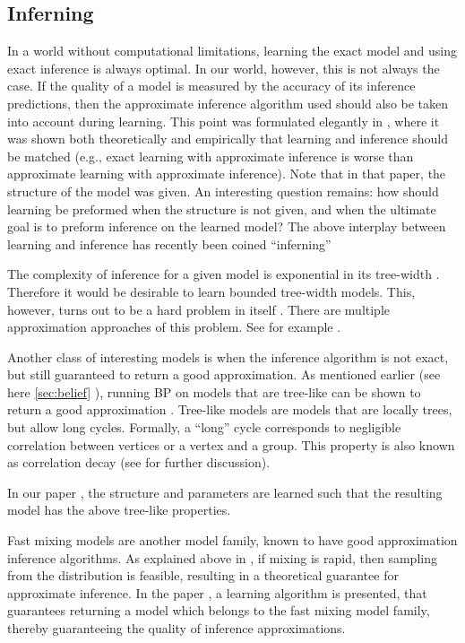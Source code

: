 \subsection{Inferning}
\label{sec:inferning}
In a world without computational limitations, learning the exact model and using exact inference is always optimal.
In our world, however, this is not always the case.
If the quality of a model is measured by the accuracy
of its inference predictions, then the approximate inference algorithm used
should also be taken into account during learning. This point was formulated
elegantly in \cite{wainwright2006estimating}, where it was shown both theoretically and empirically that learning and inference should be matched (e.g., exact learning with approximate inference is worse than approximate learning with approximate inference).
Note that in that paper, the structure of the model was given.
An interesting question remains: how should learning be preformed when the structure is not given, and when the ultimate goal is to preform inference on
the learned model?
The above interplay between learning and inference has recently been coined ``inferning'' \cite{rohanimanesh2009training}

The complexity of inference for a given model is exponential in its tree-width \cite{robertson1983graph,robertson1994quickly}.
Therefore it would be desirable to learn bounded tree-width models.
This, however, turns out to be a hard problem in itself \cite{srebro2001maximum}. There are multiple approximation approaches of this problem. See for example \cite{karger2001learning,bach2001thin,elidan2009learning}.
%

Another class of interesting models is when the inference algorithm is not exact, but still guaranteed to return a good approximation. 
As mentioned earlier (see here \ref{sec:belief} ), running BP on models that are tree-like can be shown to return a good approximation \cite{dembo2010ising}.
Tree-like models are models that are locally trees, but allow long cycles.
Formally, a ``long'' cycle corresponds to negligible correlation between vertices or a vertex and a group. This property is also known as correlation decay (see  for further discussion).
In our paper \cite{heinemann2014inferning}, the structure and parameters are learned such that the resulting model has the above tree-like properties.
%

Fast mixing models are another model family,  known to have good approximation inference algorithms.
As explained above in , if mixing is rapid, then sampling from the distribution is feasible, resulting in a theoretical guarantee for approximate inference. 
In the paper \cite{domke2015maximum}, a learning algorithm is presented, that guarantees returning a model which belongs to the fast mixing model family,
thereby guaranteeing the quality of inference approximations.

